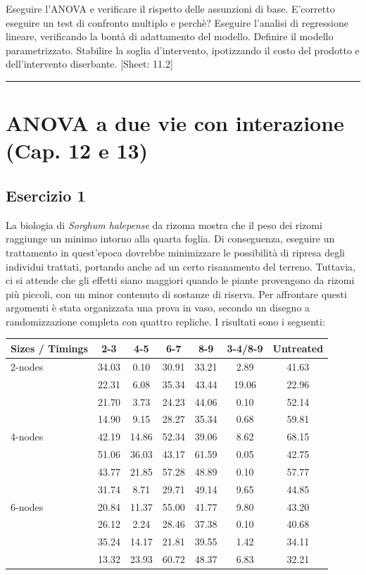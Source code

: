 \documentclass[a4paper,12pt,oneside]{book}
\begin{document}
Eseguire l'ANOVA e verificare il rispetto delle assunzioni di base. E'corretto eseguire un test di confronto multiplo e perchè? Eseguire l'analisi di regressione lineare, verificando la bontà di adattamento del modello. Definire il modello parametrizzato. Stabilire la soglia d'intervento, ipotizzando il costo del prodotto e dell'intervento diserbante.
{[}Sheet: 11.2{]}

\begin{center}\rule{0.5\linewidth}{0.5pt}\end{center}

\hypertarget{anova-a-due-vie-con-interazione-cap.-12-e-13}{%
\section{ANOVA a due vie con interazione (Cap. 12 e 13)}\label{anova-a-due-vie-con-interazione-cap.-12-e-13}}

\hypertarget{esercizio-1-8}{%
\subsection{Esercizio 1}\label{esercizio-1-8}}

La biologia di \emph{Sorghum halepense} da rizoma mostra che il peso dei rizomi raggiunge un minimo intorno alla quarta foglia. Di conseguenza, eseguire un trattamento in quest'epoca dovrebbe minimizzare le possibilità di ripresa degli individui trattati, portando anche ad un certo risanamento del terreno. Tuttavia, ci si attende che gli effetti siano maggiori quando le piante provengono da rizomi più piccoli, con un minor contenuto di sostanze di riserva. Per affrontare questi argomenti è stata organizzata una prova in vaso, secondo un disegno a randomizzazione completa con quattro repliche. I risultati sono i seguenti:

\begin{longtable}[]{@{}lcccccc@{}}
\toprule
Sizes / Timings & 2-3 & 4-5 & 6-7 & 8-9 & 3-4/8-9 & Untreated \\
\midrule
\endhead
2-nodes & 34.03 & 0.10 & 30.91 & 33.21 & 2.89 & 41.63 \\
& 22.31 & 6.08 & 35.34 & 43.44 & 19.06 & 22.96 \\
& 21.70 & 3.73 & 24.23 & 44.06 & 0.10 & 52.14 \\
& 14.90 & 9.15 & 28.27 & 35.34 & 0.68 & 59.81 \\
4-nodes & 42.19 & 14.86 & 52.34 & 39.06 & 8.62 & 68.15 \\
& 51.06 & 36.03 & 43.17 & 61.59 & 0.05 & 42.75 \\
& 43.77 & 21.85 & 57.28 & 48.89 & 0.10 & 57.77 \\
& 31.74 & 8.71 & 29.71 & 49.14 & 9.65 & 44.85 \\
6-nodes & 20.84 & 11.37 & 55.00 & 41.77 & 9.80 & 43.20 \\
& 26.12 & 2.24 & 28.46 & 37.38 & 0.10 & 40.68 \\
& 35.24 & 14.17 & 21.81 & 39.55 & 1.42 & 34.11 \\
& 13.32 & 23.93 & 60.72 & 48.37 & 6.83 & 32.21 \\
\bottomrule
\end{longtable}
\end{document}
